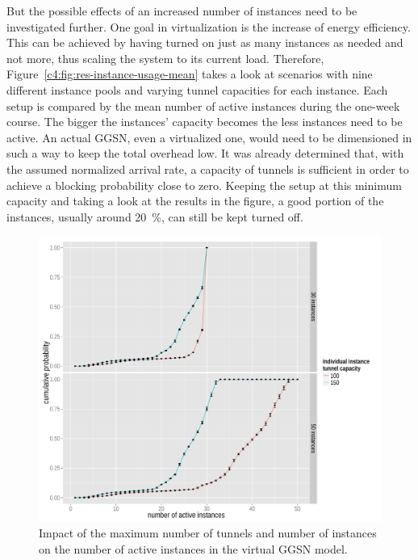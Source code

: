 But the possible effects of an increased number of instances need to be investigated further. One goal in virtualization is the increase of energy efficiency. This can be achieved by having turned on just as many instances as needed and not more, thus scaling the system to its current load. Therefore, Figure~\ref{c4:fig:res-instance-usage-mean} takes a look at scenarios with nine different instance pools and varying tunnel capacities for each instance. Each setup is compared by the mean number of active instances during the one-week course. The bigger the instances' capacity becomes the less instances need to be active. An actual \gls{GGSN}, even a virtualized one, would need to be dimensioned in such a way to keep the total overhead low. It was already determined that, with the assumed normalized arrival rate, a capacity of  tunnels is sufficient in order to achieve a blocking probability close to zero. Keeping the setup at this minimum capacity and taking a look at the results in the figure, a good portion of the instances, usually around \SI{20}{\percent}, can still be kept turned off.

\begin{figure}[htb]
	\centering
	\includegraphics[width=1.0\textwidth]{images/R-virtualized-instanceuse.pdf}
	\caption{Impact of the maximum number of tunnels and number of instances on the number of active instances in the virtual \gls{GGSN} model.}
\label{c4:fig:virtualized_instanceuse}
\end{figure}

